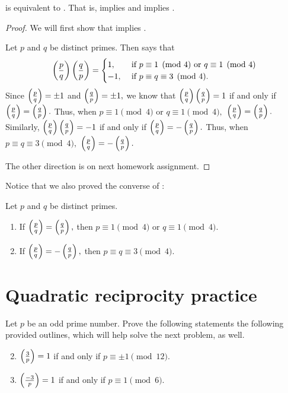 \documentclass{ximera}
\begin{document}
\begin{proposition}
  is equivalent to . That is,  implies  and  implies  .
\end{proposition}
\begin{proof}
	We will first show that  implies .
	
	Let $p$ and $q$ be distinct primes.  Then  says that 
	\[
		\left(\frac{p}{q}\right)\left(\frac{q}{p}\right)=
			\begin{cases}
 				1, & \textnormal{ if } p\equiv 1\pmod{4} \textnormal{ or } q\equiv 1\pmod{4}\\
				-1, & \textnormal{ if } p\equiv q\equiv 3\pmod{4}.
			\end{cases}
	\]
	Since $\left(\frac{p}{q}\right)=\pm 1$ and $\left(\frac{q}{p}\right)=\pm 1,$ we know that $\left(\frac{p}{q}\right)\left(\frac{q}{p}\right)=1$ if and only if $\left(\frac{p}{q}\right)=\left(\frac{q}{p}\right).$ Thus, when $p\equiv 1\pmod{4}$ or $q\equiv 1\pmod{4},$ $\left(\frac{p}{q}\right)=\left(\frac{q}{p}\right).$ Similarly, $\left(\frac{p}{q}\right)\left(\frac{q}{p}\right)=-1$ if and only if $\left(\frac{p}{q}\right)=-\left(\frac{q}{p}\right).$ Thus, when $p\equiv q\equiv 3\pmod{4},$ $\left(\frac{p}{q}\right)=-\left(\frac{q}{p}\right).$ 
	
	The other direction is on next homework assignment.
\end{proof}

Notice that we also proved the converse of :
\begin{corollary}\label{cor:quad-rec}
	Let $p$ and $q$ be distinct primes.  
	\begin{enumerate}[label=(\alph*)]
		\item If $\left(\frac{p}{q}\right)=\left(\frac{q}{p}\right),$ then $p\equiv 1 \pmod{4}$ or $q\equiv 1\pmod{4}.$
 		\item If $\left(\frac{p}{q}\right)=-\left(\frac{q}{p}\right),$ then $p\equiv q \equiv 3 \pmod{4}.$
	\end{enumerate}
\end{corollary}


\section{Quadratic reciprocity practice}

\begin{br}
	Let $p$ be an odd prime number. Prove the following statements the following provided outlines, which will help solve the next problem, as well.
	
	\begin{enumerate}[label=(\alph*)]
	\setcounter{enumi}{1}
		\item $\left(\frac{3}{p}\right)=1$ if and only if $p\equiv \pm1\pmod{12}.$
		\item $\left(\frac{-3}{p}\right)=1$ if and only if $p\equiv 1\pmod{6}.$	
	\end{enumerate}
\end{br}
\end{document}

